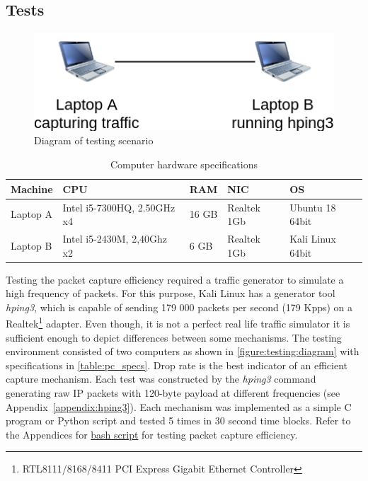 \documentclass[12pt,a4paper,twoside]{report}
\begin{document}
		\subsection{Tests} \label{analysis:testing:tests}
			\begin{figure}[h]
				\centering
				\includegraphics[scale=0.5]{diagram}
				\caption{Diagram of testing scenario}
				\label{figure:testing:diagram}
			\end{figure}
			\begin{table}[h!]
			\centering
			\begin{tabular}{ |p{2.0cm}||p{3.0cm}|p{1.3cm}|p{1.2cm}|p{3.0cm}| }
 				\hline
 				Machine & CPU & RAM & NIC & OS \\
 				\hline
 				Laptop A & Intel i5-7300HQ, 2.50GHz x4 & 16 GB & Realtek 1Gb & Ubuntu 18 64bit \\
 				\hline
 				Laptop B & Intel i5-2430M, 2,40Ghz x2 & 6 GB & Realtek 1Gb & Kali Linux 64bit \\
 				\hline
			\end{tabular}
			\caption{Computer hardware specifications}
			\label{table:pc_specs}
			\end{table}	
			Testing the packet capture efficiency required a traffic generator to simulate a high frequency of packets. For this purpose, Kali Linux has a generator tool \emph{hping3}, which is capable of sending 179 000 packets per second (179 Kpps) on a Realtek\footnote{RTL8111/8168/8411 PCI Express Gigabit Ethernet Controller} adapter. Even though, it is not a perfect real life traffic simulator it is sufficient enough to depict differences between some mechanisms. The testing environment consisted of two computers as shown in \autoref{figure:testing:diagram} with specifications in \autoref{table:pc_specs}. Drop rate is the best indicator of an efficient capture mechanism. Each test was constructed by the \emph{hping3} command generating raw IP packets with 120-byte payload at different frequencies (see Appendix~\ref{appendix:hping3}). Each mechanism was implemented as a simple C program or Python script and tested 5 times in 30 second time blocks. Refer to the Appendices for \hyperref[appendix:script:droprate]{bash script} for testing packet capture efficiency.\par		
\end{document}
